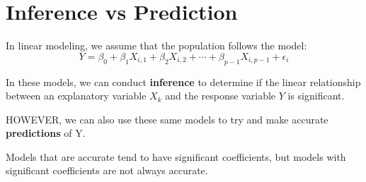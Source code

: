 \documentclass[12pt]{../notes}
\begin{document}

\begin{minipage}[l][3cm][c]{\textwidth}
\begin{comment}
\note{As seen before, a practical difference is not always significant, but a significant difference is not always practical.}

\note{When sample sizes are LARGE, nearly every difference is flagged as significant, even if the actual difference between groups is small.}
\end{comment}
\end{minipage}

\section{Inference vs Prediction}
In linear modeling, we assume that the population follows the model:
\[Y = \beta_0 + \beta_1X_{i,1} + \beta_2X_{i,2} + \cdots + \beta_{p-1}X_{i, p-1} + \epsilon_i\]

\nspace
In these models, we can conduct \textbf{inference} to determine if the linear relationship between an explanatory variable $X_k$ and the response variable $Y$ is significant. 

\nspace
HOWEVER, we can also use these same models to try and make accurate \textbf{predictions} of Y. 

\nspace
Models that are accurate tend to have significant coefficients, but models with significant coefficients are not always accurate. 



\begin{minipage}[l][3cm][c]{\textwidth}
\begin{comment}
\note{Accuracy: Predicting the market value of a house given square footage, lot size, etc.}

\nspace
\note{Significance: Determining if there is a statistically significant gender bias in pay, after accounting for other demographic factors.}
\end{comment}
\end{minipage}


























\end{document}
